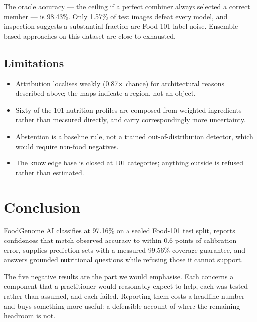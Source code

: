 \documentclass[11pt,a4paper,twoside]{article}
\newcommand{\num}[1]{\mbox{#1}}
\begin{document}
The oracle accuracy --- the ceiling if a perfect combiner always selected a correct member
--- is \num{98.43\%}. Only \num{1.57\%} of test images defeat every model, and inspection
suggests a substantial fraction are Food-101 label noise. Ensemble-based approaches on this
dataset are close to exhausted.

\subsection{Limitations}

\begin{itemize}
  \item Attribution localises weakly (\num{0.87}$\times$ chance) for architectural reasons
        described above; the maps indicate a region, not an object.
  \item Sixty of the 101 nutrition profiles are composed from weighted ingredients rather
        than measured directly, and carry correspondingly more uncertainty.
  \item Abstention is a baseline rule, not a trained out-of-distribution detector, which
        would require non-food negatives.
  \item The knowledge base is closed at 101 categories; anything outside is refused rather
        than estimated.
\end{itemize}

\section{Conclusion}

FoodGenome AI classifies at \num{97.16\%} on a sealed Food-101 test split, reports
confidences that match observed accuracy to within \num{0.6} points of calibration error,
supplies prediction sets with a measured \num{99.56\%} coverage guarantee, and answers
grounded nutritional questions while refusing those it cannot support.

The five negative results are the part we would emphasise. Each concerns a component that a
practitioner would reasonably expect to help, each was tested rather than assumed, and each
failed. Reporting them costs a headline number and buys something more useful: a defensible
account of where the remaining headroom is not.
\end{document}
